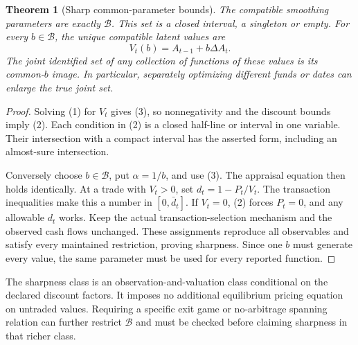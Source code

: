 \documentclass[11pt]{article}
\newtheorem{theorem}{Theorem}
\theoremstyle{remark}
\begin{document}
\begin{theorem}[Sharp common-parameter bounds]
The compatible smoothing parameters are exactly $\mathcal B$. This set
is a closed interval, a singleton or empty. For every $b\in\mathcal B$,
the unique compatible latent values are
\[
 V_t(b)=A_{t-1}+b\Delta A_t.                                       \tag{3}
\]
The joint identified set of any collection of functions of these values
is its common-$b$ image. In particular, separately optimizing different
funds or dates can enlarge the true joint set.
\end{theorem}
\begin{proof}
Solving (1) for $V_t$ gives (3), so nonnegativity and the discount bounds
imply (2). Each condition in (2) is a closed half-line or interval in one
variable. Their intersection with a compact interval has the asserted
form, including an almost-sure intersection.

Conversely choose $b\in\mathcal B$, put $\alpha=1/b$, and use (3).
The appraisal equation then holds identically. At a trade with $V_t>0$,
set $d_t=1-P_t/V_t$. The transaction inequalities make this a number
in $[0,\bar d_t]$. If $V_t=0$, (2) forces $P_t=0$, and any allowable
$d_t$ works. Keep the actual transaction-selection mechanism and the
observed cash flows unchanged. These assignments reproduce all observables
and satisfy every maintained restriction, proving sharpness. Since one
$b$ must generate every value, the same parameter must be used for every
reported function.
\end{proof}
The sharpness class is an observation-and-valuation class conditional on
the declared discount factors. It imposes no additional equilibrium
pricing equation on untraded values. Requiring a specific exit game or
no-arbitrage spanning relation can further restrict $\mathcal B$ and
must be checked before claiming sharpness in that richer class.
\end{document}
